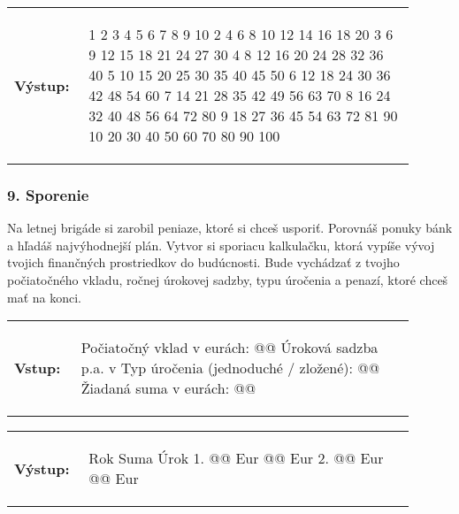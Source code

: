 \begin{tabular}{@{}p{0.15\linewidth}p{0.75\linewidth}}
\textbf{\small Výstup:} &
\vspace{-3em}
\begin{code}
  1   2   3   4   5   6   7   8   9  10
  2   4   6   8  10  12  14  16  18  20
  3   6   9  12  15  18  21  24  27  30
  4   8  12  16  20  24  28  32  36  40
  5  10  15  20  25  30  35  40  45  50
  6  12  18  24  30  36  42  48  54  60
  7  14  21  28  35  42  49  56  63  70
  8  16  24  32  40  48  56  64  72  80
  9  18  27  36  45  54  63  72  81  90
 10  20  30  40  50  60  70  80  90 100
\end{code}
\end{tabular}
\vspace{-2em}


\subsubsection*{9. Sporenie}
Na letnej brigáde si zarobil peniaze, ktoré si chceš usporiť. Porovnáš ponuky bánk a hľadáš najvýhodnejší plán. Vytvor si sporiacu kalkulačku, ktorá vypíše vývoj tvojich finančných prostriedkov do budúcnosti. Bude vychádzať z tvojho počiatočného vkladu, ročnej úrokovej sadzby, typu úročenia a penazí, ktoré chceš mať na konci.

\begin{tabular}{@{}p{0.15\linewidth}p{0.75\linewidth}}
\textbf{\small Vstup:} &
\vspace{-3em}
\begin{code}
Počiatočný vklad v eurách: @\fbox{\phantom{vstup}}@
Úroková sadzba p.a. v %
Typ úročenia (jednoduché / zložené): @\fbox{\phantom{vstup}}@
Žiadaná suma v eurách: @\fbox{\phantom{vstup}}@
\end{code}
\end{tabular}

\vspace{-2em}
\begin{tabular}{@{}p{0.15\linewidth}p{0.75\linewidth}}
\textbf{\small Výstup:} &
\vspace{-3em}
\begin{code}
Rok      Suma						Úrok
 1.		@\fbox{\phantom{vstup}}@ Eur	@\fbox{\phantom{vstup}}@ Eur
 2.		@\fbox{\phantom{vstup}}@ Eur	@\fbox{\phantom{vstup}}@ Eur
\end{code}
\end{tabular}
\vspace{-2em}
